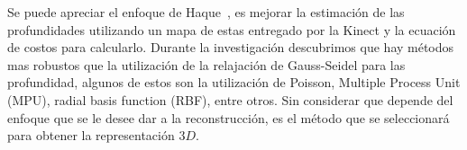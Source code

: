 \documentclass[twocolumn,11pts]{IEEEtran}
\begin{document}
Se puede apreciar el enfoque de Haque~\cite{ourpaper}, es mejorar la estimación de las profundidades utilizando un mapa de estas entregado por la Kinect y la ecuación de costos para calcularlo. Durante la investigación descubrimos que hay métodos mas robustos que la utilización de la relajación de Gauss-Seidel para las profundidad, algunos de estos son la utilización de Poisson, Multiple Process Unit (MPU), radial basis function (RBF), entre otros. Sin considerar que depende del enfoque que se le desee dar a la reconstrucción, es el método que se seleccionará para obtener la representación $3D$.






\end{document}
